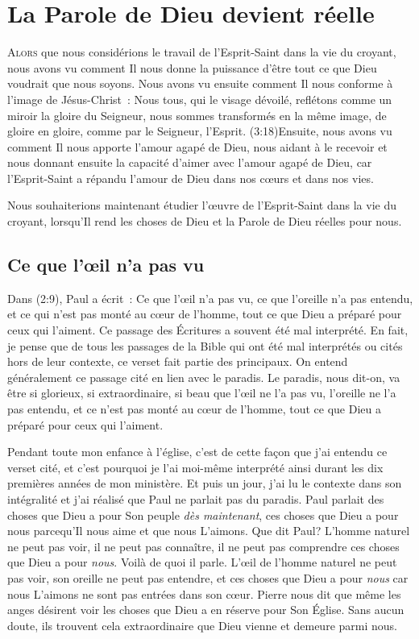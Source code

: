 \chapter{La Parole de Dieu devient r\'eelle}

\lettrine{A}{lors} que nous considérions
 le travail de l'Esprit-Saint
 dans la vie du croyant, nous avons vu comment Il nous donne la puissance
 d'être tout ce que Dieu voudrait que nous soyons.
 Nous avons vu ensuite comment Il nous conforme à l'image de Jésus-Christ~:
 \og Nous tous, qui le visage dévoilé, reflétons comme un miroir la gloire
 du Seigneur, nous sommes transformés en la même image, de gloire en gloire,
 comme par le Seigneur, l'Esprit. \fg{}
 (3:18)Ensuite, nous avons vu comment
 Il nous apporte l'amour agapé de Dieu,
 nous aidant à le recevoir et nous donnant ensuite la capacité d'aimer
 avec l'amour agapé de Dieu, car l'Esprit-Saint a répandu l'amour de Dieu
 dans nos cœurs et dans nos vies.

Nous souhaiterions maintenant étudier l'œuvre de l'Esprit-Saint dans la vie
 du croyant, lorsqu'Il rend les choses de Dieu et la Parole de Dieu
 réelles pour nous.


\section{Ce que l'\oe{}il n'a pas vu}

Dans (2:9), Paul a écrit~:
 \og Ce que l'œil n'a pas vu, ce que l'oreille n'a pas entendu,
 et ce qui n'est pas monté au cœur de l'homme, tout ce que Dieu
 a préparé pour ceux qui l'aiment. \fg{}
 Ce passage des Écritures a souvent été mal interprété. En fait,
 je pense que de tous les passages de la Bible qui ont été mal interprétés
 ou cités hors de leur contexte, ce verset fait partie des principaux.
 On entend généralement ce passage cité en lien avec le paradis.
 Le paradis, nous dit-on, va être si glorieux, si extraordinaire,
 si beau que \og l'œil ne l'a pas vu, l'oreille ne l'a pas entendu,
 et ce n'est pas monté au cœur de l'homme, tout ce que Dieu a préparé
 pour ceux qui l'aiment. \fg{}
 \nowidow

Pendant toute mon enfance à l'église, c'est de cette façon que j'ai entendu
 ce verset cité, et c'est pourquoi je l'ai moi-même interprété ainsi
 durant les dix premières années de mon ministère.
 Et puis un jour, j'ai lu le contexte dans son intégralité et j'ai réalisé
 que Paul ne parlait pas du paradis. Paul parlait des choses que Dieu
 a pour Son peuple \emph{dès maintenant},
 ces choses que Dieu a pour nous parcequ'Il
 nous aime et que nous L'aimons. Que dit Paul?
 L'homme naturel ne peut pas voir, il ne peut pas connaître,
 il ne peut pas comprendre ces choses que Dieu a pour \emph{nous}.
 Voilà de quoi il parle. L'œil de l'homme naturel ne peut pas voir,
 son oreille ne peut pas entendre, et ces choses que Dieu a pour \emph{nous}
 car nous L'aimons ne sont pas entrées dans son cœur.
 Pierre nous dit que même les anges désirent voir les choses que Dieu
 a en réserve pour Son Église.
 Sans aucun doute, ils trouvent cela extraordinaire que Dieu vienne
 et demeure parmi nous.


